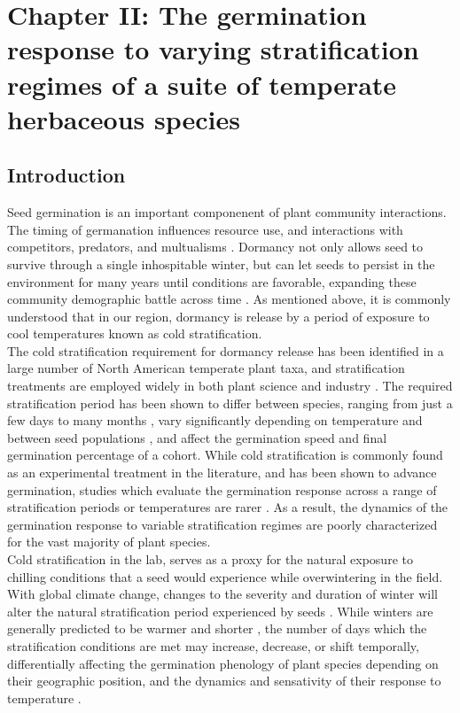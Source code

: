 \documentclass[12pt]{article}\usepackage[]{graphicx}\usepackage[]{color}
\begin{document}
\section*{Chapter II: The germination response to varying stratification regimes of a suite of temperate herbaceous species}
\subsection*{Introduction}
\indent\indent Seed germination is an important componenent of plant community interactions. The timing of germanation influences resource use, and interactions with competitors, predators, and multualisms \citep{Korner2008,Rathcke1985,Gioria2018}. Dormancy not only allows seed to survive through a single inhospitable winter, but can let seeds to persist in the environment for many years until conditions are favorable, expanding these community demographic battle across time \citep{Long2015}. As mentioned above, it is commonly understood that in our region, dormancy is release by a period of exposure to cool temperatures known as cold stratification.\\
\indent\indent The cold stratification requirement for dormancy release has been identified in a large number of North American temperate plant taxa, and stratification treatments are employed widely in both plant science and industry \citep{Hartmann_2011}. The required stratification period has been shown to differ between species, ranging from just a few days to many months \citep{Luna2009}, vary significantly depending on temperature and between seed populations \citep{Steadman2004}, and affect the germination speed and final germination percentage of a cohort. While cold stratification is commonly found as an experimental treatment in the literature, and has been shown to advance germination, studies which evaluate the germination response across a range of stratification periods or temperatures are rarer \citep{Batlla2009}. As a result, the dynamics of the germination response to variable stratification regimes are poorly characterized for the vast majority of plant species.\\
\indent Cold stratification in the lab, serves as a proxy for the natural exposure to chilling conditions that a seed would experience while overwintering in the field. With global climate change, changes to the severity and duration of winter will alter the natural stratification period experienced by seeds \citep{Walck2011}. While winters are generally predicted to be warmer and shorter \citep{IPCC_2014}, the number of days which the stratification conditions are met may increase, decrease, or shift temporally, differentially affecting the germination phenology of plant species depending on their geographic position, and the dynamics and sensativity of their response to temperature \citep{Walck2011}. \\
\end{document}
